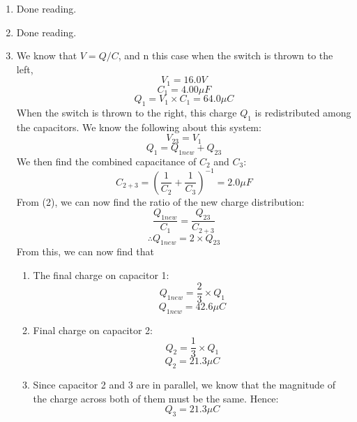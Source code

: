 \documentclass{article}
\begin{document}
\begin{enumerate}
	\item Done reading.
	\item Done reading.

	\item	
		We know that $V = Q/C$,
		and n this case when the switch is thrown to the left,
		\begin{equation} V_1 = 16.0 V \end{equation}
		\[C_1 = 4.00 \mu F\]
		\[Q_1 = V_1 \times C_1 = 64.0 \mu C \]
		When the switch is thrown to the right, this charge $Q_1$ is redistributed among the capacitors. We know the following about this system:
		\begin{equation} V_{23} = V_1 \end{equation}
		\begin{equation} Q_1 = Q_{1new} + Q_{23} \end{equation}
		We then find the combined capacitance of $C_2$ and $C_3$: 
		\[ C_{2+3} = (\frac{1}{C_2}+\frac{1}{C_3})^{-1} = 2.0 \mu F \]
		From (2), we can now find the ratio of the new charge distribution:
		\[ \frac{Q_{1new}}{C_1} = \frac{Q_{23}}{C_{2+3}} \]
		\[ \therefore Q_{1new} = 2 \times Q_{23} \]
		From this, we can now find that
		\begin{enumerate}[label=(\alph*)]
			\item The final charge on capacitor 1:
				\[ Q_{1new} = \frac{2}{3} \times Q_1 \]
				\[ Q_{1new} =  42.6 \mu C \]
			\item Final charge on capacitor 2:
				\[ Q_{2} = \frac{1}{3} \times Q_1 \]
				\[ Q_{2} =  21.3 \mu C \]
			\item Since capacitor 2 and 3 are in parallel, we know that the magnitude of the charge across both of them must be the same. Hence:
				\[ Q_{3} = 21.3 \mu C \] 
		\end{enumerate}
		

\end{enumerate}
\end{document}
